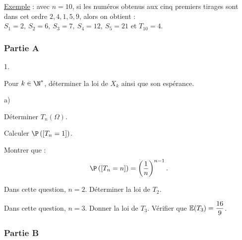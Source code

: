 \documentclass[11pt]{article}%
\begin{document}
{\underline{Exemple} : avec $n = 10$, si les numéros obtenus aux cinq
premiers tirages sont dans cet ordre $2,4,1,5,9$, alors on obtient :
$S_{1} = 2,~ S_{2} = 6,~ S_{3} = 7,~ S_{4} = 12,~ S_{5} = 21$ et
$T_{10} = 4$.

\subsubsection*{Partie A}

\begin{noliste}{1.}
 \setlength{\itemsep}{4mm}
	\item Pour $k\in\N^*$, déterminer la loi de $X_{k}$ ainsi que son
espérance.
	\item \begin{noliste}{a)}
 \setlength{\itemsep}{2mm}
		\item Déterminer $T_{n}(\Omega)$.
		\item Calculer $\P\left(\Ev{T_{n} = 1}\right)$.
		\item Montrer que :
			\[
\P\left(\Ev{T_{n} = n}\right) = \left(\dfrac1n\right)^{n-1}.
\]
	\end{noliste}
	\item Dans cette question, $n = 2$. Déterminer la loi de $T_{2}$.
	\item Dans cette question, $n = 3$. Donner la loi de $T_{3}$. Vérifier
que $\mathbb{E}(T_{3}) = \dfrac{16}9$.
\end{noliste}

\subsubsection*{Partie B}

}
\end{document}
